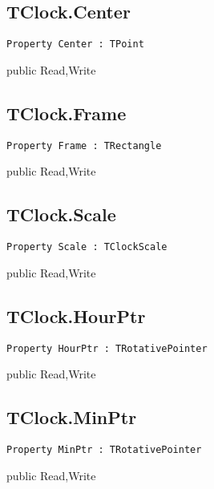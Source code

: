 \subsection{TClock.Center}
\label{hmi:retroclock:tclock:center}
\begin{FPCList}
\Declaration 

\begin{verbatim}
Property Center : TPoint
\end{verbatim}
\Visibility
public
\Access
Read,Write
\end{FPCList}
\subsection{TClock.Frame}
\label{hmi:retroclock:tclock:frame}
\begin{FPCList}
\Declaration 

\begin{verbatim}
Property Frame : TRectangle
\end{verbatim}
\Visibility
public
\Access
Read,Write
\end{FPCList}
\subsection{TClock.Scale}
\label{hmi:retroclock:tclock:scale}
\begin{FPCList}
\Declaration 

\begin{verbatim}
Property Scale : TClockScale
\end{verbatim}
\Visibility
public
\Access
Read,Write
\end{FPCList}
\subsection{TClock.HourPtr}
\label{hmi:retroclock:tclock:hourptr}
\begin{FPCList}
\Declaration 

\begin{verbatim}
Property HourPtr : TRotativePointer
\end{verbatim}
\Visibility
public
\Access
Read,Write
\end{FPCList}
\subsection{TClock.MinPtr}
\label{hmi:retroclock:tclock:minptr}
\begin{FPCList}
\Declaration 

\begin{verbatim}
Property MinPtr : TRotativePointer
\end{verbatim}
\Visibility
public
\Access
Read,Write
\end{FPCList}
